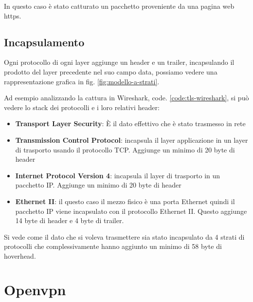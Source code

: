 In questo caso è stato catturato un pacchetto proveniente da una pagina web https.

\subsection{Incapsulamento}

Ogni protocollo di ogni layer aggiunge un header e un trailer, incapsulando il prodotto del layer precedente nel suo campo data, possiamo vedere una rappresentazione grafica in fig. \ref{fig:modello-a-strati}.

Ad esempio analizzando la cattura in Wireshark, code. \ref{code:tls-wireshark}, si può vedere lo stack dei protocolli e i loro relativi header:

\begin{itemize}
    \item \textbf{Transport Layer Security}\cite{RFC_8446}: È il dato effettivo che è stato trasmesso in rete

    \item \textbf{Transmission Control Protocol}\cite{RFC_0793}: incapsula il layer applicazione in un layer di trasporto usando il protocollo TCP. Aggiunge un minimo di 20 byte di header

    \item \textbf{Internet Protocol Version 4}\cite{RFC_0791}: incapsula il layer di trasporto in un pacchetto IP. Aggiunge un minimo di 20 byte di header

    \item \textbf{Ethernet II}\cite{ethernet-ii}: il questo caso il mezzo fisico è una porta Ethernet quindi il pacchetto IP viene incapsulato con il protocollo Ethernet II. Questo aggiunge 14 byte di header e 4 byte di trailer.
\end{itemize}

Si vede come il dato che si voleva trasmettere sia stato incapsulato da 4 strati di protocolli che complessivamente hanno aggiunto un minimo di 58 byte di hoverhead.


\section{Openvpn}


